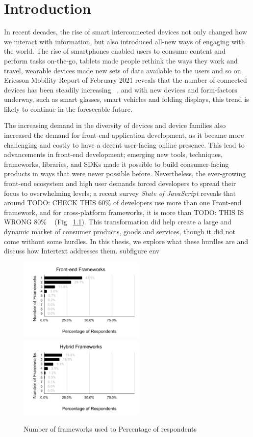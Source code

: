 
\chapter{Introduction}

In recent decades, the rise of smart interconnected devices not only changed how we interact with information, but also introduced all-new ways of engaging with the world. The rise of smartphones enabled users to consume content and perform tasks on-the-go, tablets made people rethink the ways they work and travel, wearable devices made new sets of data available to the users and so on. Ericsson Mobility Report of February 2021 reveals that the number of connected devices has been steadily increasing ~\cite{EricssonMobility2020}, and with new devices and form-factors underway, such as smart glasses, smart vehicles and folding displays, this trend is likely to continue in the foreseeable future. 

The increasing demand in the diversity of devices and device families also increased the demand for front-end application development, as it became more challenging and costly to have a decent user-facing online presence. This lead to advancements in front-end development; emerging new tools, techniques, frameworks, libraries, and SDKs made it possible to build consumer-facing products in ways that were never possible before. Nevertheless, the ever-growing front-end ecosystem and high user demands forced developers to spread their focus to overwhelming levels; a recent survey \textit{State of JavaScript} reveals that around TODO: CHECK THIS 60\% of developers use more than one Front-end framework, and for cross-platform frameworks, it is more than TODO: THIS IS WRONG 80\% ~\cite{StateOfJs2020} (Fig ~\ref{fig:num_of_frameworks_used}). This transformation did help create a large and dynamic market of consumer products, goods and services, though it did not come without some hurdles. In this thesis, we explore what these hurdles are and discuss how Intertext addresses them.
subfigure env
\begin{figure}
  \centering
  \includegraphics[width=6.2cm]{images/sojs1.pdf}
  \,
  \includegraphics[width=6.2cm]{images/sojs2.pdf}
  \caption{Number of frameworks used to Percentage of respondents}%
  \label{fig:num_of_frameworks_used}%
\end{figure}





